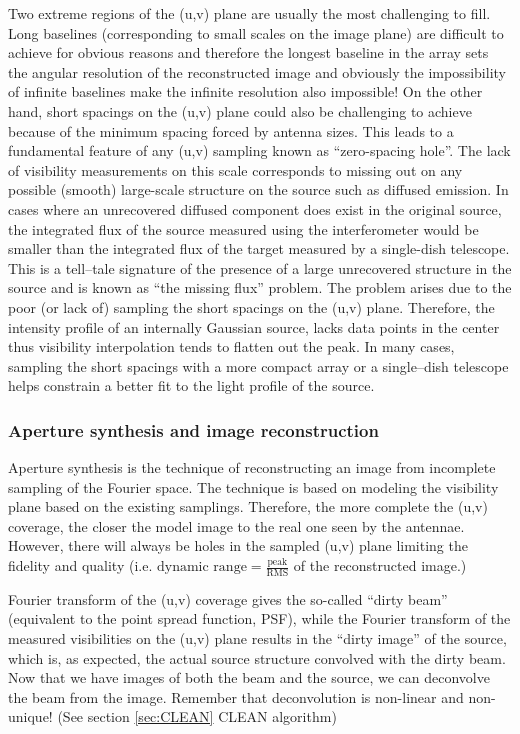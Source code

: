 \documentclass[paper=a4, fontsize=11pt]{scrartcl} %
\numberwithin{equation}{section} %
\numberwithin{figure}{section} %
\numberwithin{table}{section} %
\begin{document}
Two extreme regions of the (u,v) plane are usually the most challenging to fill. Long baselines (corresponding to small scales on the image plane) are difficult to achieve for obvious reasons and therefore the longest baseline in the array sets the angular resolution of the reconstructed image and obviously the impossibility of infinite baselines make the infinite resolution also impossible! On the other hand, short spacings on the (u,v) plane could also be challenging to achieve because of the minimum spacing forced by antenna sizes. This leads to a fundamental feature of any (u,v) sampling known as ``zero-spacing hole''. The lack of visibility measurements on this scale corresponds to missing out on any possible (smooth) large-scale structure on the source such as diffused emission. In cases where an unrecovered diffused component does exist in the original source, the integrated flux of the source measured using the interferometer would be smaller than the integrated flux of the target measured by a single-dish telescope. This is a tell--tale signature of the presence of a large unrecovered structure in the source and is known as ``the missing flux'' problem. The problem arises due to the poor (or lack of) sampling the short spacings on the (u,v) plane. Therefore, the intensity profile of an internally Gaussian source, lacks data points in the center thus visibility interpolation tends to flatten out the peak. In many cases, sampling the short spacings with a more compact array or a single--dish telescope helps constrain a better fit to the light profile of the source.

\subsubsection*{Aperture synthesis and image reconstruction}
Aperture synthesis is the technique of reconstructing an image from incomplete sampling of the Fourier space. The technique is based on modeling the visibility plane based on the existing samplings. Therefore, the more complete the (u,v) coverage, the closer the model image to the real one seen by the antennae. However, there will always be holes in the sampled (u,v) plane limiting the fidelity and quality (i.e. $\text{dynamic range} = \frac{\text{peak}}{\text{RMS}}$ of the reconstructed image.)

Fourier transform of the (u,v) coverage gives the so-called ``dirty beam'' (equivalent to the point spread function, PSF), while the Fourier transform of the measured visibilities on the (u,v) plane results in the ``dirty image'' of the source, which is, as expected, the actual source structure convolved with the dirty beam. Now that we have images of both the beam and the source, we can deconvolve the beam from the image. Remember that deconvolution is non-linear and non-unique! (See section \ref{sec:CLEAN} CLEAN algorithm)
\end{document}
